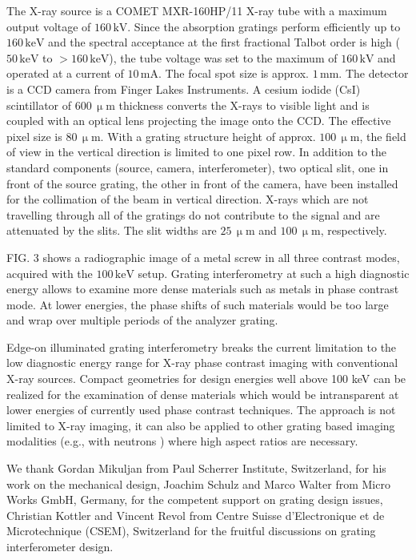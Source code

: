 \documentclass[aip,apl,amsmath,amssymb,floatfix,reprint,a4paper]{revtex4-1}
\newcommand{\unit}[1]{\ensuremath{\, \mathrm{#1}}}
\begin{document}
The X-ray source is a COMET MXR-160HP/11 X-ray tube with a maximum output voltage of $160 \unit{kV}$. Since the absorption gratings perform efficiently up to $160 \unit{keV}$ and the spectral acceptance at the first fractional Talbot order is high ($50 \unit{keV}$ to $>160 \unit{keV}$), the tube voltage was set to the maximum of $160 \unit{kV}$ and operated at a current of $10 \unit{mA}$. The focal spot size is approx. $1 \unit{mm}$. The detector is a CCD camera from Finger Lakes Instruments. A cesium iodide (CsI) scintillator of $600 \unit{\upmu m}$ thickness converts the X-rays to visible light and is coupled with an optical lens projecting the image onto the CCD. The effective pixel size is $80 \unit{\upmu m}$. With a grating structure height of approx. $100 \unit{\upmu m}$, the field of view in the vertical direction is limited to one pixel row. In addition to the standard components (source, camera, interferometer), two optical slit, one in front of the source grating, the other in front of the camera, have been installed for the collimation of the beam in vertical direction. X-rays which are not travelling through all of the gratings do not contribute to the signal and are attenuated by the slits. The slit widths are $25 \unit{\upmu m}$ and $100 \unit{\upmu m}$, respectively.

FIG. 3 shows a radiographic image of a metal screw in all three contrast modes, acquired with the $100 \unit{keV}$ setup. Grating interferometry at such a high diagnostic energy allows to examine more dense materials such as metals in phase contrast mode. At lower energies, the phase shifts of such materials would be too large and wrap over multiple periods of the analyzer grating.


Edge-on illuminated grating interferometry breaks the current limitation to the low diagnostic energy range for X-ray phase contrast imaging with conventional X-ray sources. Compact geometries for design energies well above 100 keV can be realized for the examination of dense materials which would be intransparent at lower energies of currently used phase contrast techniques. The approach is not limited to X-ray imaging, it can also be applied to other grating based imaging modalities (e.g., with neutrons \cite{Grunzweig2008}) where high aspect ratios are necessary.

We thank Gordan Mikuljan from Paul Scherrer Institute, Switzerland, for his work on the mechanical design, Joachim Schulz and Marco Walter from Micro Works GmbH, Germany, for the competent support on grating design issues, Christian Kottler and Vincent Revol from Centre Suisse d'Electronique et de Microtechnique (CSEM), Switzerland for the fruitful discussions on grating interferometer design.





\end{document}
